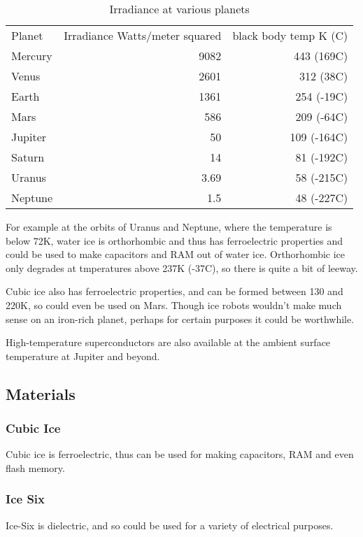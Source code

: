 \begin{table}
  \caption{Irradiance at various planets}
  \begin{tabular}{lrr}
    Planet & Irradiance Watts/meter squared & black body temp K (C) \\
    Mercury & 9082\cite{nasaMercury} & 443 (169C)\cite{bbtemp}\\
    Venus & 2601\cite{nasaVenus} & 312\cite{bbtemp} (38C) \\
    Earth & 1361\cite{nasaEarth} & 254\cite{nasaEarth} (-19C) \\
    Mars & 586\cite{nasaMars} & 209\cite{nasaMars} (-64C) \\
    Jupiter & 50\cite{nasaJupiter} & 109\cite{nasaJupiter} (-164C) \\
    Saturn & 14\cite{nasaSaturn} & 81\cite{nasaJupiter} (-192C)\\ 
    Uranus & 3.69\cite{nasaUranus} & 58\cite{nasaUranus} (-215C)\\
    Neptune & 1.5\cite{nasaNeptune} & 48\cite{bbtemp} (-227C) \\
\end{tabular}
\end{table}

For example at the orbits of Uranus and Neptune, where the temperature is below
72K, water ice is orthorhombic and thus has ferroelectric properties and could
be used to make capacitors and RAM out of water ice. Orthorhombic ice only
degrades at tmperatures above 237K (-37C), so there is quite a bit of leeway. 

Cubic ice also has ferroelectric properties, and can be formed between 130 and
220K, so could even be used on Mars. Though ice robots wouldn't make much sense
on an iron-rich planet, perhaps for certain purposes it could be worthwhile. 


High-temperature superconductors are also available at the ambient surface 
temperature at Jupiter and beyond.
\subsection{Materials}
\subsubsection{Cubic Ice}
Cubic ice is ferroelectric\cite{Cubic Ice}, thus can be used for making
capacitors, RAM and even flash memory. 

\subsubsection{Ice Six}
Ice-Six is dielectric\cite{iceSix}, and so could be used for a variety of
electrical purposes. 

